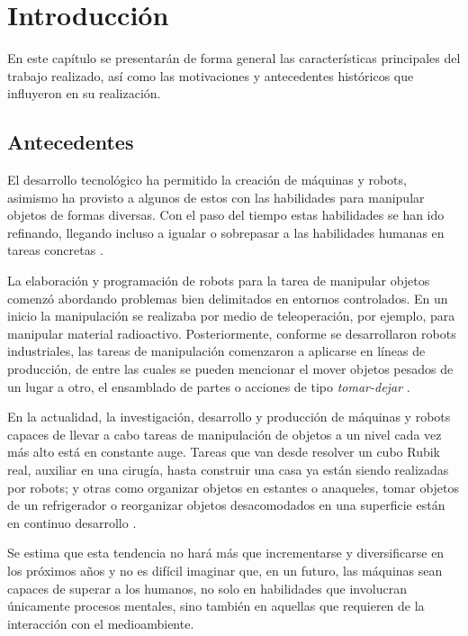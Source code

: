 \chapter{Introducción}
\label{chap:int}
%
%
En este capítulo se presentarán de forma general las características principales del trabajo realizado, así como las motivaciones y antecedentes históricos que influyeron en su realización.
%
%
\section{Antecedentes}
%
%
El desarrollo tecnológico ha permitido la creación de máquinas y robots, asimismo ha provisto a algunos de estos con las habilidades para manipular objetos de formas diversas.
Con el paso del tiempo estas habilidades se han ido refinando, llegando incluso a igualar o sobrepasar a las habilidades humanas en tareas concretas \cite{1256297}\cite{BastianSolutions}.

La elaboración y programación de robots para la tarea de manipular objetos comenzó abordando problemas bien delimitados en entornos controlados.
En un inicio la manipulación se realizaba por medio de teleoperación, por ejemplo, para manipular material radioactivo.
Posteriormente, conforme se desarrollaron robots industriales, las tareas de manipulación comenzaron a aplicarse en líneas de producción, de entre las cuales se pueden mencionar el mover objetos pesados de un lugar a otro, el ensamblado de partes o acciones de tipo \textsl{tomar-dejar} \cite{doi:10.1146/annurev-control-060117-104848}\cite{murray2017mathematical}\cite{4141037}.

En la actualidad, la investigación, desarrollo y producción de máquinas y robots capaces de llevar a cabo tareas de manipulación de objetos a un nivel cada vez más alto está en constante auge.
Tareas que van desde resolver un cubo Rubik real, auxiliar en una cirugía, hasta construir una casa ya están siendo realizadas por robots; y otras como organizar objetos en estantes o anaqueles, tomar objetos de un refrigerador o reorganizar objetos desacomodados en una superficie están en continuo desarrollo \cite{7743540}\cite{7139396}\cite{7759839}\cite{6906894}.

Se estima que esta tendencia no hará más que incrementarse y diversificarse en los próximos años y no es difícil imaginar que, en un futuro, las máquinas sean capaces de superar a los humanos, no solo en habilidades que involucran únicamente procesos mentales, sino también en aquellas que requieren de la interacción con el medioambiente.

